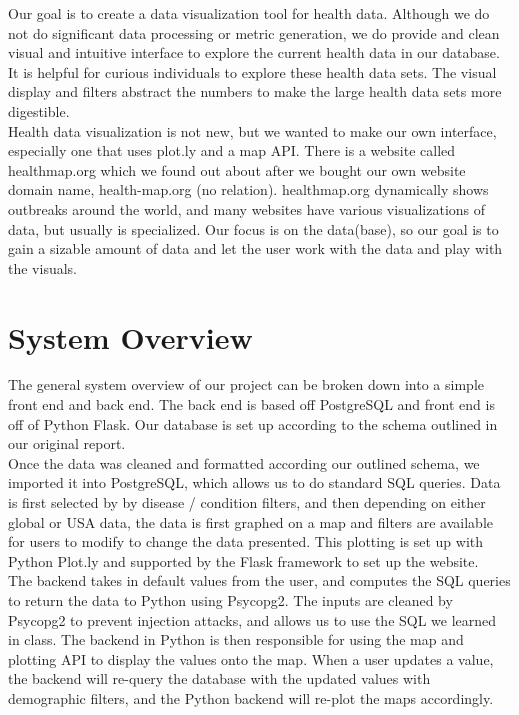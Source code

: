 \documentclass[12pt]{article}
\begin{document}
Our goal is to create a data visualization tool for health data. Although we do not do significant data processing or metric generation, we do provide and clean visual and intuitive interface to explore the current health data in our database. It is helpful for curious individuals to explore these health data sets. The visual display and filters abstract the numbers to make the large health data sets more digestible.\\

Health data visualization is not new, but we wanted to make our own interface, especially one that uses plot.ly and a map API. There is a website called healthmap.org which we found out about after we bought our own website domain name, health-map.org (no relation). healthmap.org dynamically shows outbreaks around the world, and many websites have various visualizations of data, but usually is specialized. Our focus is on the data(base), so our goal is to gain a sizable amount of data and let the user work with the data and play with the visuals.\\
\section{System Overview}
The general system overview of our project can be broken down into a simple front end and back end. The back end is based off PostgreSQL and front end is off of Python Flask. Our database is set up according to the schema outlined in our original report.\\

Once the data was cleaned and formatted according our outlined schema, we imported it into PostgreSQL, which allows us to do standard SQL queries. Data is first selected by by disease / condition filters, and then depending on either global or USA data, the data is first graphed on a map and filters are available for users to modify to change the data presented. This plotting is set up with Python Plot.ly and supported by the Flask framework to set up the website.\\

The backend takes in default values from the user, and computes the SQL queries to return the data to Python using Psycopg2. The inputs are cleaned by Psycopg2 to prevent injection attacks, and allows us to use the SQL we learned in class. The backend in Python is then responsible for using the map and plotting API to display the values onto the map. When a user updates a value, the backend will re-query the database with the updated values with demographic filters, and the Python backend will re-plot the maps accordingly. \\
\end{document}

